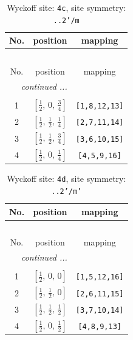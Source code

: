 \documentclass[fleqn,8pt]{jsarticle}
\begin{document}
\renewcommand{\arraystretch}{1.2}
\begin{longtable}{ccc}
\caption{Wyckoff site: {\tt 4c}, site symmetry: {\tt ..2'/m}}
 \\
 \hline \hline
No. & position & mapping \\ \hline \endfirsthead

\multicolumn{2}{l}{\tablename\ \thetable{}} \\
 \hline \hline
No. & position & mapping \\ \hline \endhead

 \hline \hline
\multicolumn{2}{r}{\footnotesize\it continued ...} \\ \endfoot

 \hline \hline
\multicolumn{2}{r}{} \\ \endlastfoot

1 & $\left[ \frac{1}{2},\, 0,\, \frac{3}{4} \right]$ & {\tt [1,8,12,13]} \\ \hline
2 & $\left[ \frac{1}{2},\, \frac{1}{2},\, \frac{1}{4} \right]$ & {\tt [2,7,11,14]} \\ \hline
3 & $\left[ \frac{1}{2},\, \frac{1}{2},\, \frac{3}{4} \right]$ & {\tt [3,6,10,15]} \\ \hline
4 & $\left[ \frac{1}{2},\, 0,\, \frac{1}{4} \right]$ & {\tt [4,5,9,16]} \\
\end{longtable}
\renewcommand{\arraystretch}{1.2}
\begin{longtable}{ccc}
\caption{Wyckoff site: {\tt 4d}, site symmetry: {\tt ..2'/m'}}
 \\
 \hline \hline
No. & position & mapping \\ \hline \endfirsthead

\multicolumn{2}{l}{\tablename\ \thetable{}} \\
 \hline \hline
No. & position & mapping \\ \hline \endhead

 \hline \hline
\multicolumn{2}{r}{\footnotesize\it continued ...} \\ \endfoot

 \hline \hline
\multicolumn{2}{r}{} \\ \endlastfoot

1 & $\left[ \frac{1}{2},\, 0,\, 0 \right]$ & {\tt [1,5,12,16]} \\ \hline
2 & $\left[ \frac{1}{2},\, \frac{1}{2},\, 0 \right]$ & {\tt [2,6,11,15]} \\ \hline
3 & $\left[ \frac{1}{2},\, \frac{1}{2},\, \frac{1}{2} \right]$ & {\tt [3,7,10,14]} \\ \hline
4 & $\left[ \frac{1}{2},\, 0,\, \frac{1}{2} \right]$ & {\tt [4,8,9,13]} \\
\end{longtable}
\end{document}
